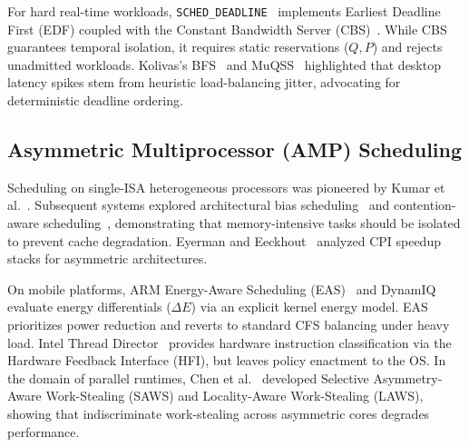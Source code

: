 \documentclass[letterpaper,twocolumn,10pt]{article}
\begin{document}
For hard real-time workloads, \texttt{SCHED\_DEADLINE}~\cite{lelli2016scheddeadline} implements Earliest Deadline First (EDF) coupled with the Constant Bandwidth Server (CBS)~\cite{abeni1998cbs,lipari2000cbs}. While CBS guarantees temporal isolation, it requires static reservations ($Q, P$) and rejects unadmitted workloads. Kolivas's BFS~\cite{kolivas2009bfs} and MuQSS~\cite{kolivas2016muqss} highlighted that desktop latency spikes stem from heuristic load-balancing jitter, advocating for deterministic deadline ordering.

\subsection{Asymmetric Multiprocessor (AMP) Scheduling}
Scheduling on single-ISA heterogeneous processors was pioneered by Kumar et al.~\cite{kumar2003singleisa,kumar2004singleisa}. Subsequent systems explored architectural bias scheduling~\cite{koufaty2010bias} and contention-aware scheduling~\cite{blagodurov2011numa,zhuravlev2010addressing,saez2012comprehensive}, demonstrating that memory-intensive tasks should be isolated to prevent cache degradation. Eyerman and Eeckhout~\cite{eyerman2014probabilistic,eyerman2008system} analyzed CPI speedup stacks for asymmetric architectures.

On mobile platforms, ARM Energy-Aware Scheduling (EAS)~\cite{rasmussen2018eas} and DynamIQ evaluate energy differentials ($\Delta E$) via an explicit kernel energy model. EAS prioritizes power reduction and reverts to standard CFS balancing under heavy load. Intel Thread Director~\cite{intel2021hfi,neri2022hfi} provides hardware instruction classification via the Hardware Feedback Interface (HFI), but leaves policy enactment to the OS. In the domain of parallel runtimes, Chen et al.~\cite{chen2016saws,chen2015laws} developed Selective Asymmetry-Aware Work-Stealing (SAWS) and Locality-Aware Work-Stealing (LAWS), showing that indiscriminate work-stealing across asymmetric cores degrades performance.
\end{document}
